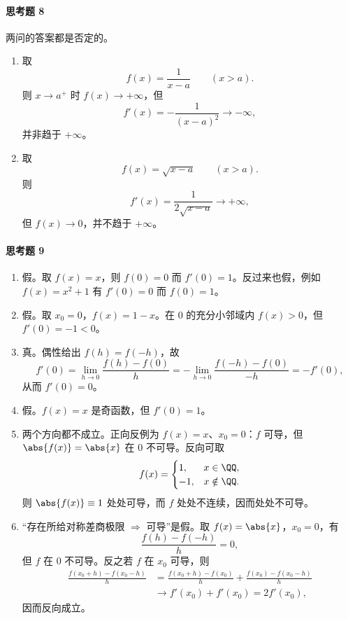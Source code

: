 \paragraph{思考题 8}
\begin{xsolution}
两问的答案都是否定的。
\begin{enumerate}[label=(\arabic*)]
  \item 取
  \[
    f(x)=\frac1{x-a}\qquad(x>a).
  \]
  则 $x\to a^+$ 时 $f(x)\to+\infty$，但
  \[
    f'(x)=-\frac1{(x-a)^2}\to-\infty,
  \]
  并非趋于 $+\infty$。

  \item 取
  \[
    f(x)=\sqrt{x-a}\qquad(x>a).
  \]
  则
  \[
    f'(x)=\frac1{2\sqrt{x-a}}\to+\infty,
  \]
  但 $f(x)\to0$，并不趋于 $+\infty$。
\end{enumerate}
\end{xsolution}

\paragraph{思考题 9}
\begin{xsolution}
\begin{enumerate}[label=(\arabic*)]
  \item 假。取 $f(x)=x$，则 $f(0)=0$ 而 $f'(0)=1$。反过来也假，例如 $f(x)=x^2+1$ 有 $f'(0)=0$ 而 $f(0)=1$。

  \item 假。取 $x_0=0$，$f(x)=1-x$。在 $0$ 的充分小邻域内 $f(x)>0$，但 $f'(0)=-1<0$。

  \item 真。偶性给出 $f(h)=f(-h)$，故
  \[
    f'(0)=\lim_{h\to0}\frac{f(h)-f(0)}h
    =-\lim_{h\to0}\frac{f(-h)-f(0)}{-h}=-f'(0),
  \]
  从而 $f'(0)=0$。

  \item 假。$f(x)=x$ 是奇函数，但 $f'(0)=1$。

  \item 两个方向都不成立。正向反例为 $f(x)=x$、$x_0=0$：$f$ 可导，但 $\abs{f(x)}=\abs{x}$ 在 $0$ 不可导。反向可取
  \[
    f(x)=
    \begin{cases}
      1,&x\in\QQ,\\
      -1,&x\notin\QQ.
    \end{cases}
  \]
  则 $\abs{f(x)}\equiv1$ 处处可导，而 $f$ 处处不连续，因而处处不可导。

  \item “存在所给对称差商极限 $\Rightarrow$ 可导”是假。取 $f(x)=\abs{x}$，$x_0=0$，有
  \[
    \frac{f(h)-f(-h)}h=0,
  \]
  但 $f$ 在 $0$ 不可导。反之若 $f$ 在 $x_0$ 可导，则
  \begin{align*}
    \frac{f(x_0+h)-f(x_0-h)}h
    &=\frac{f(x_0+h)-f(x_0)}h
      +\frac{f(x_0)-f(x_0-h)}h\\
    &\longrightarrow f'(x_0)+f'(x_0)=2f'(x_0),
  \end{align*}
  因而反向成立。
\end{enumerate}
\end{xsolution}

